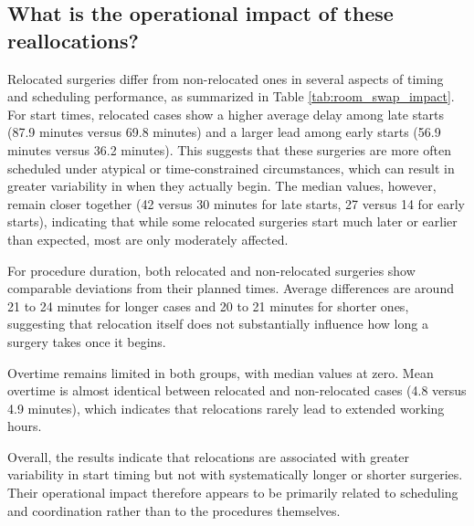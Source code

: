 \documentclass[
]{article}
\begin{document}
\subsection{What is the operational impact of these
reallocations?}\label{what-is-the-operational-impact-of-these-reallocations}

Relocated surgeries differ from non-relocated ones in several aspects of
timing and scheduling performance, as summarized in Table
\ref{tab:room_swap_impact}. For start times, relocated cases show a
higher average delay among late starts (87.9 minutes versus 69.8
minutes) and a larger lead among early starts (56.9 minutes versus 36.2
minutes). This suggests that these surgeries are more often scheduled
under atypical or time-constrained circumstances, which can result in
greater variability in when they actually begin. The median values,
however, remain closer together (42 versus 30 minutes for late starts,
27 versus 14 for early starts), indicating that while some relocated
surgeries start much later or earlier than expected, most are only
moderately affected.

For procedure duration, both relocated and non-relocated surgeries show
comparable deviations from their planned times. Average differences are
around 21 to 24 minutes for longer cases and 20 to 21 minutes for
shorter ones, suggesting that relocation itself does not substantially
influence how long a surgery takes once it begins.

Overtime remains limited in both groups, with median values at zero.
Mean overtime is almost identical between relocated and non-relocated
cases (4.8 versus 4.9 minutes), which indicates that relocations rarely
lead to extended working hours.

Overall, the results indicate that relocations are associated with
greater variability in start timing but not with systematically longer
or shorter surgeries. Their operational impact therefore appears to be
primarily related to scheduling and coordination rather than to the
procedures themselves.
\end{document}
